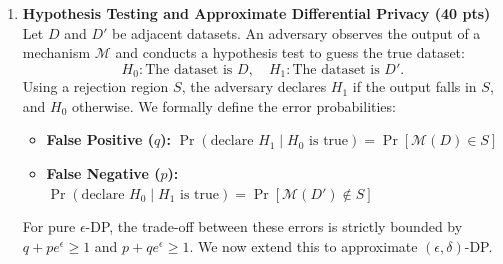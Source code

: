 \documentclass[12pt]{article}
\begin{document}
\begin{enumerate}
\begin{solution}
\begin{enumerate}
\item 
Using the approximation $e^\varepsilon \approx 1 + \varepsilon$ for small $\varepsilon$:
\begin{itemize}
    \item $\hat{p}_{\text{central}}$ variance is already independent of this approximation: $\approx \mathcal{O}\left( \frac{1}{n^2 \varepsilon^2} \right)$
    \item $\hat{p}_{\text{local}}$ variance simplifies to: $\frac{1 + \varepsilon}{n (1 + \varepsilon - 1)^2} = \frac{1 + \varepsilon}{n \varepsilon^2} \approx \frac{1}{n \varepsilon^2}$
\end{itemize}
To find how much more data is required for the Local model to match the Central model's accuracy, we equate the variances:
\[
\text{Var}(\hat{p}_{\text{local}}) = \text{Var}(\hat{p}_{\text{central}})
\]
\[
\frac{1}{n_{\text{local}} \varepsilon^2} = \frac{2}{n_{\text{central}}^2 \varepsilon^2}
\]
Solving for $n_{\text{local}}$:
\[
n_{\text{local}} = \frac{1}{2} n_{\text{central}}^2
\]
\end{enumerate}
\end{solution}

\begin{problem}
    \newpage
    {\bf extra sheet}
    \newpage
\end{problem}


\item {\bf Hypothesis Testing and Approximate Differential Privacy (40 pts)}
Let $D$ and $D'$ be adjacent datasets. An adversary observes the output of a mechanism $\mathcal{M}$ and conducts a hypothesis test to guess the true dataset:
\[
H_0\colon \text{The dataset is } D, \quad H_1\colon \text{The dataset is } D'.
\]
Using a rejection region $S$, the adversary declares $H_1$ if the output falls in $S$, and $H_0$ otherwise. We formally define the error probabilities:
\begin{itemize}
    \item \textbf{False Positive ($q$):} $\Pr(\text{declare } H_1 \mid H_0 \text{ is true}) = \Pr[\mathcal{M}(D) \in S]$
    \item \textbf{False Negative ($p$):} $\Pr(\text{declare } H_0 \mid H_1 \text{ is true}) = \Pr[\mathcal{M}(D') \notin S]$
\end{itemize}
For pure $\epsilon$-DP, the trade-off between these errors is strictly bounded by $q + p e^\epsilon \ge 1$ and $p + q e^\epsilon \ge 1$. We now extend this to approximate $(\epsilon, \delta)$-DP.


\end{enumerate}
\end{document}
